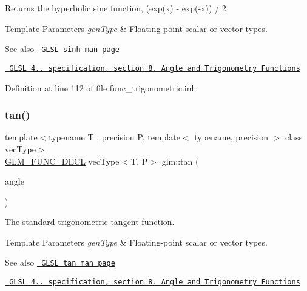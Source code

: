 Returns the hyperbolic sine function, (exp(x) -\/ exp(-\/x)) / 2


\begin{DoxyTemplParams}{Template Parameters}
{\em gen\+Type} & Floating-\/point scalar or vector types.\\
\hline
\end{DoxyTemplParams}
\begin{DoxySeeAlso}{See also}
\href{http://www.opengl.org/sdk/docs/manglsl/xhtml/sinh.xml}{\texttt{ G\+L\+SL sinh man page}} 

\href{http://www.opengl.org/registry/doc/GLSLangSpec.4.20.8.pdf}{\texttt{ G\+L\+SL 4.. specification, section 8. Angle and Trigonometry Functions}} 
\end{DoxySeeAlso}


Definition at line 112 of file func\+\_\+trigonometric.\+inl.

\mbox{\label{group__core__func__trigonometric_gab3ae890c38b7d3aa4d5e00998fd296b2}} 
\subsubsection{\texorpdfstring{tan()}{tan()}}
{\footnotesize\ttfamily template$<$typename T , precision P, template$<$ typename, precision $>$ class vec\+Type$>$ \\
\mbox{\hyperlink{setup_8hpp_ab2d052de21a70539923e9bcbf6e83a51}{G\+L\+M\+\_\+\+F\+U\+N\+C\+\_\+\+D\+E\+CL}} vec\+Type$<$T, P$>$ glm\+::tan (\begin{DoxyParamCaption}\item[{vec\+Type$<$ T, P $>$ const \&}]{angle }\end{DoxyParamCaption})}

The standard trigonometric tangent function.


\begin{DoxyTemplParams}{Template Parameters}
{\em gen\+Type} & Floating-\/point scalar or vector types.\\
\hline
\end{DoxyTemplParams}
\begin{DoxySeeAlso}{See also}
\href{http://www.opengl.org/sdk/docs/manglsl/xhtml/tan.xml}{\texttt{ G\+L\+SL tan man page}} 

\href{http://www.opengl.org/registry/doc/GLSLangSpec.4.20.8.pdf}{\texttt{ G\+L\+SL 4.. specification, section 8. Angle and Trigonometry Functions}} 
\end{DoxySeeAlso}


